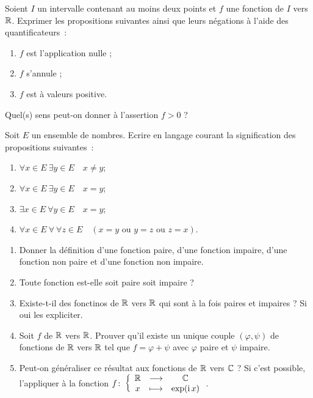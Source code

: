 %
\begin{exercice}

Soient \(I\) un intervalle contenant au moins deux points et \(f\) une fonction de \(I\) vers \(\mathbb{R}\). Exprimer les
propositions suivantes ainsi que leurs négations à l'aide des quantificateurs~:
\begin{enumerate}
    \item \(f\) est l'application nulle ;
    \item \(f\) s'annule ;
    \item \(f\) est à valeurs positive.
\end{enumerate}
Quel(s) sens peut-on donner à l'assertion \(f>0\) ?
\end{exercice}
%
\begin{exercice}

Soit \(E\) un ensemble de nombres. Ecrire en langage courant la signification des propositions suivantes~:
\begin{enumerate}
    \item \(\forall x \in E \ \exists y \in E \quad x \neq y\);
    \item \(\forall x \in E \ \exists y \in E \quad x = y\);
    \item \(\exists x \in E \ \forall y \in E \quad x = y\);
    \item \(\forall x \in E \ \forall \ \forall z \in E \quad (x=y \textrm{~ou~} y=z \textrm{~ou~} z=x)\).
\end{enumerate}
\end{exercice}
%
\begin{exercice}

\begin{enumerate}
    \item Donner la définition d'une fonction paire, d'une fonction impaire, d'une fonction non paire et d'une fonction non impaire.
    \item Toute fonction est-elle soit paire soit impaire ?
    \item Existe-t-il des fonctinos de \(\mathbb{R}\) vers \(\mathbb{R}\) qui sont à la fois paires  et impaires ? Si oui les expliciter.
    \item Soit \(f\) de \(\mathbb{R}\) vers \(\mathbb{R}\). Prouver qu'il existe un unique couple \((\varphi, \psi)\) de fonctions de \(\mathbb{R}\) vers
        \(\mathbb{R}\) tel que \(f=\varphi+\psi\) avec \(\varphi\) paire et \(\psi\) impaire.
    \item Peut-on généraliser ce résultat aux fonctions de \(\mathbb{R}\) vers \(\mathbb{C}\) ? Si c'est possible, l'appliquer à la fonction \(f\colon \left\{\begin{array}{ccc} \mathbb{R} & \longrightarrow &\mathbb{C}\\ x & \longmapsto & \exp(\operatorname{i} x) \end{array} \right.\).
\end{enumerate}
\end{exercice}
